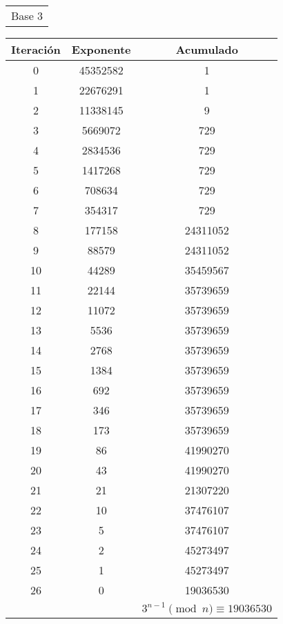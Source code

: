 \documentclass[fleqn]{article}
\begin{document}
\begin{center}
\begin{tabular}{c}
            Base 3 \\
        \end{tabular}
        \begin{tabular}{c | c | c}
            Iteración & Exponente & Acumulado \\ \hline
            0 & 45352582 & 1 \\
            1 & 22676291 & 1 \\
            2 & 11338145 & 9 \\
            3 & 5669072 & 729 \\
            4 & 2834536 & 729 \\
            5 & 1417268 & 729 \\
            6 & 708634 & 729 \\
            7 & 354317 & 729 \\
            8 & 177158 & 24311052 \\
            9 & 88579 & 24311052 \\
            10 & 44289 & 35459567 \\
            11 & 22144 & 35739659 \\
            12 & 11072 & 35739659 \\
            13 & 5536 & 35739659 \\
            14 & 2768 & 35739659 \\
            15 & 1384 & 35739659 \\
            16 & 692 & 35739659 \\
            17 & 346 & 35739659 \\
            18 & 173 & 35739659 \\
            19 & 86 & 41990270 \\
            20 & 43 & 41990270 \\
            21 & 21 & 21307220 \\
            22 & 10 & 37476107 \\
            23 & 5 & 37476107 \\
            24 & 2 & 45273497 \\
            25 & 1 & 45273497 \\
            26 & 0 & 19036530 \\
            && $ 3^{n-1} \pmod{n} \equiv 19036530 $
        \end{tabular}


\end{center}
\end{document}
